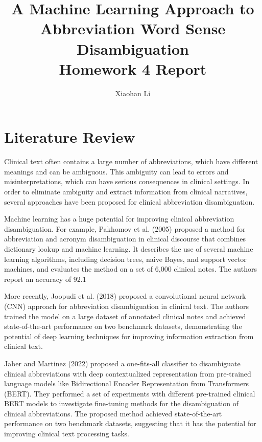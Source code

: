 \documentclass{article}
\author{Xiaohan Li}
\title{\huge{A Machine Learning Approach to Abbreviation Word Sense Disambiguation}\\
\LARGE{Homework 4 Report}}
\begin{document}
    \begin{titlepage}
        \maketitle    
    \end{titlepage}
    \tableofcontents
    \section{Literature Review}
    Clinical text often contains a large number of abbreviations, which have different meanings and can be ambiguous. This ambiguity can lead to errors and misinterpretations, which can have serious consequences in clinical settings. In order to eliminate ambiguity and extract information from clinical narratives, several approaches have been proposed for clinical abbreviation disambiguation.

    Machine learning has a huge potential for improving clinical abbreviation disambiguation. For example, Pakhomov et al. (2005) proposed a method for abbreviation and acronym disambiguation in clinical discourse that combines dictionary lookup and machine learning.\cite{pakhomov2005abbreviation} It describes the use of several machine learning algorithms, including decision trees, naive Bayes, and support vector machines, and evaluates the method on a set of 6,000 clinical notes. The authors report an accuracy of 92.1%

    More recently, Joopudi et al. (2018) proposed a convolutional neural network (CNN) approach for abbreviation disambiguation in clinical text.\cite{joopudi2018convolutional} The authors trained the model on a large dataset of annotated clinical notes and achieved state-of-the-art performance on two benchmark datasets, demonstrating the potential of deep learning techniques for improving information extraction from clinical text.

    Jaber and Martinez (2022) proposed a one-fits-all classifier to disambiguate clinical abbreviations with deep contextualized representation from pre-trained language models like Bidirectional Encoder Representation from Transformers (BERT).\cite{jaber2022disambiguating} They performed a set of experiments with different pre-trained clinical BERT models to investigate fine-tuning methods for the disambiguation of clinical abbreviations. The proposed method achieved state-of-the-art performance on two benchmark datasets, suggesting that it has the potential for improving clinical text processing tasks.
\end{document}
